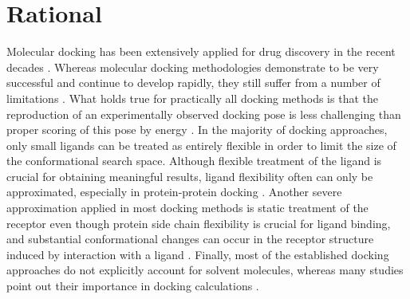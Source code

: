 \section{Rational}
Molecular docking has been extensively applied for drug
discovery in the recent decades \cite{klebe_recent_2000,
cheng_structure-based_2012}. Whereas molecular docking methodologies demonstrate
to be very successful and continue to develop rapidly, they still suffer from a
number of limitations \cite{moreira_proteinprotein_2010,
andrusier_principles_2008,lensink_docking_2010}. What holds true for practically
all docking methods is that the reproduction of an experimentally observed
docking pose is less challenging than proper scoring of this pose by energy
\cite{kim_assessment_2008, plewczynski_can_2011,smith_csar_2011}. In the
majority of docking approaches, only small ligands can be treated as entirely
flexible in order to limit the size of the conformational search space. Although
flexible treatment of the ligand is crucial for obtaining meaningful results,
ligand flexibility often can only be approximated, especially in protein-protein
docking \cite{ritchie_recent_2008}. Another severe approximation applied in most
docking methods is static treatment of the receptor even though protein side
chain flexibility is crucial for ligand binding, and substantial conformational
changes can occur in the receptor structure induced by interaction with a ligand
\cite{gunasekaran_how_2007,gutteridge_conformational_2005}. Finally, most of the
established docking approaches do not explicitly account for solvent molecules,
whereas many studies point out their importance in docking calculations
\cite{van_dijk_solvated_2006,baron_water_2010,roberts_ligandprotein_2008,
thilagavathi_ligand-protein_2010}.

